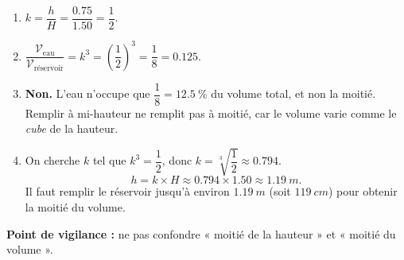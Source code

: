 \documentclass[11pt]{article}
\begin{document}
\begin{corrige}
\begin{enumerate}
    \item $k = \dfrac{h}{H} = \dfrac{\num{0,75}}{\num{1,50}} = \dfrac{1}{2}$.
    \item $\dfrac{\mathcal{V}_{\text{eau}}}{\mathcal{V}_{\text{réservoir}}} = k^3 = \left(\dfrac{1}{2}\right)^3 = \dfrac{1}{8} = \num{0,125}$.
    \item \textbf{Non.} L'eau n'occupe que $\dfrac{1}{8} = \SI{12,5}{\%}$ du volume total, et non la moitié. Remplir à mi-hauteur ne remplit pas à moitié, car le volume varie comme le \emph{cube} de la hauteur.
    \item On cherche $k$ tel que $k^3 = \dfrac{1}{2}$, donc $k = \sqrt[3]{\dfrac{1}{2}} \approx \num{0,794}$.
    \[
    h = k \times H \approx \num{0,794} \times \num{1,50} \approx \SI{1,19}{m}.
    \]
    Il faut remplir le réservoir jusqu'à environ $\SI{1,19}{m}$ (soit $\SI{119}{cm}$) pour obtenir la moitié du volume.
\end{enumerate}
\textbf{Point de vigilance :} ne pas confondre « moitié de la hauteur » et « moitié du volume ».
\end{corrige}
\end{document}
